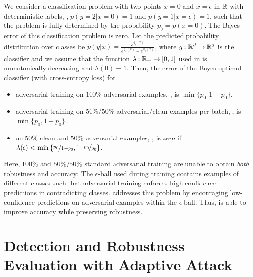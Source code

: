 \begin{proposition}\label{prop:toy-example}
    We consider a classification problem with two points $x=0$ and $x=\epsilon$ in $\mR$ with deterministic labels, \ie,
    $p(y=2|x=0)=1$ and $p(y=1|x=\epsilon)=1$, such that the problem is fully determined by the probability $p_0=p(x=0)$. 
    The Bayes error of this classification problem is zero. Let the predicted probability distribution over classes be $\tilde{p}(y|x)=\frac{e^{g_y(x)}}{e^{g_1(x)}+e^{g_2(x)}}$, where $g:\R^d \rightarrow \R^2$ is the classifier and we assume that the function $\lambda:\mR_+ \rightarrow [0,1]$ used in \ConfTrain is monotonically decreasing and $\lambda(0)=1$. Then, the error of the Bayes optimal classifier (with cross-entropy loss) for
    \vspace*{-8px}
    \begin{itemize}
    \item adversarial training on $100\%$ adversarial examples, \cf {}, 
    is $\min\{p_0,1-p_0\}$.
    \vspace*{-3px}
    \item adversarial training on $50\%$/$50\%$ adversarial/clean examples per batch, \cf {}, 
    is $\min\{p_0,1 - p_0\}$.
    \vspace*{-3px}
    \item \ConfTrain on $50\%$ clean and $50\%$ adversarial examples, \cf {}, 
    is \emph{zero} 
    if $\lambda(\epsilon) < \min\left\{\nicefrac{p_0}{1-p_0},\nicefrac{1-p_0}{p_0}\right\}$.
    \vspace*{-6px}
    \end{itemize}
\end{proposition}

Here, $100\%$ and $50\%$/$50\%$ standard adversarial training are unable to obtain \emph{both} robustness and accuracy: The $\epsilon$-ball used during training contains examples of different classes such that adversarial training enforces high-confidence predictions in contradicting classes. \ConfTrain addresses this problem by encouraging low-confidence predictions on adversarial examples within the $\epsilon$-ball. Thus, \ConfTrain is able to improve accuracy while preserving robustness.

\section{Detection and Robustness Evaluation with Adaptive Attack}
\label{sec:evaluation-attack}

